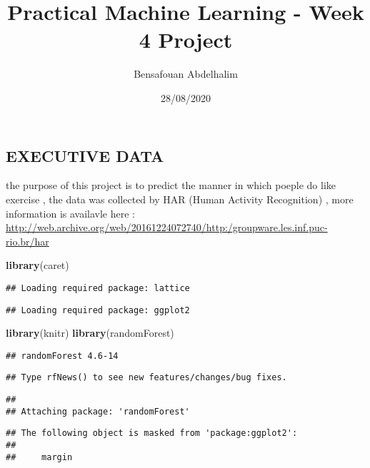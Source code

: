 \documentclass[
]{article}
\title{Practical Machine Learning - Week 4 Project}
\author{Bensafouan Abdelhalim}
\date{28/08/2020}
\newenvironment{Shaded}{\begin{snugshade}}{\end{snugshade}}
\newcommand{\KeywordTok}[1]{\textcolor[rgb]{0.13,0.29,0.53}{\textbf{#1}}}
\newcommand{\NormalTok}[1]{#1}
\begin{document}
\maketitle

\hypertarget{executive-data}{%
\subsection{EXECUTIVE DATA}\label{executive-data}}

the purpose of this project is to predict the manner in which poeple do
like exercise , the data was collected by HAR (Human Activity
Recognition) , more information is availavle here :
\url{http://web.archive.org/web/20161224072740/http:/groupware.les.inf.puc-rio.br/har}

\begin{Shaded}
\begin{Highlighting}[]
\KeywordTok{library}\NormalTok{(caret)}
\end{Highlighting}
\end{Shaded}

\begin{verbatim}
## Loading required package: lattice
\end{verbatim}

\begin{verbatim}
## Loading required package: ggplot2
\end{verbatim}

\begin{Shaded}
\begin{Highlighting}[]
\KeywordTok{library}\NormalTok{(knitr)}
\KeywordTok{library}\NormalTok{(randomForest)}
\end{Highlighting}
\end{Shaded}

\begin{verbatim}
## randomForest 4.6-14
\end{verbatim}

\begin{verbatim}
## Type rfNews() to see new features/changes/bug fixes.
\end{verbatim}

\begin{verbatim}
## 
## Attaching package: 'randomForest'
\end{verbatim}

\begin{verbatim}
## The following object is masked from 'package:ggplot2':
## 
##     margin
\end{verbatim}
\end{document}
